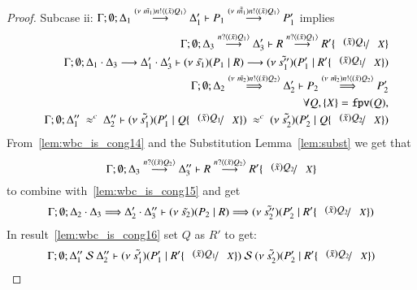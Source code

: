 \begin{proof}
	\noi Subcase ii: $\Gamma; \emptyset; \Delta_1 \stackrel{(\nu\ \tilde{m_1}) n ! \langle (\tilde{x})Q_1 \rangle}{\longrightarrow} \Delta_1' \vdash P_1 \stackrel{(\nu\ \tilde{\tilde{m_1}}) n ! \langle (\tilde{x})Q_1 \rangle}{\longrightarrow} P_1'$ implies
%
	\begin{eqnarray}
		& & \Gamma; \emptyset; \Delta_3 \by{\bactinp{n}{\abs{\tilde{x}} {Q_1}}} \Delta_3' \proves R \by{\bactinp{n}{\abs{\tilde{x}} {Q_1}}} R' \subst{\abs{\tilde{x}}{Q_1}}{X}
		\label{lem:wbc_is_cong14}\\
		& & \Gamma; \emptyset; \Delta_1 \cat \Delta_3 \by{} \Delta_1' \cat \Delta_3' \proves \newsp{\tilde{s_1}}{P_1 \Par R} \by{} \newsp{\tilde{s_1''}}{P_1' \Par R' \subst{\abs{\tilde{x}}{Q_1}}{X}} \nonumber \\
		& & \Gamma; \emptyset; \Delta_2\By{\news{\tilde{m_2}} \bactout{n}{\abs{\tilde{x}}{Q_2}}} \Delta_2' \proves P_2 \By{\news{\tilde{m_2}} \bactout{n}{\abs{\tilde{x}}{Q_2}}} P_2'
		\label{lem:wbc_is_cong15}\\
		& & \forall Q, \set{X} = \fpv{Q}, \nonumber \\
		& & \Gamma; \emptyset; \Delta_1''\ \wbc\ \Delta_2'' \proves \newsp{\tilde{s_1'}}{P_1' \Par Q \subst{(\tilde{x}) Q_1}{X}}\ \wbc\ \newsp{\tilde{s_2'}}{P_2' \Par Q \subst{(\tilde{x}) Q_2}{X}} \label{lem:wbc_is_cong16}
	\end{eqnarray}
%
	From~\ref{lem:wbc_is_cong14} and the Substitution Lemma~\ref{lem:subst} we get that
	\[
		\Gamma; \emptyset; \Delta_3 \by{\bactinp{n}{\abs{\tilde{x}} {Q_2}}} \Delta_3'' \proves R \by{\bactinp{n}{\abs{\tilde{x}} {Q_2}}} R' \subst{\abs{\tilde{x}}{Q_2}}{X}
	\]
	\noi to combine with~\ref{lem:wbc_is_cong15} and get
	\[
		\Gamma; \emptyset; \Delta_2 \cat \Delta_3 \By{} \Delta_2' \cat \Delta_3'' \proves \newsp{\tilde{s_2}}{P_2 \Par R} \By{} \newsp{\tilde{s_2''}}{P_2' \Par R' \subst{\abs{\tilde{x}}{Q_2}}{X}}
	\]
%
	\noi In result~\ref{lem:wbc_is_cong16} set $Q$ as $R'$ to get:
%
	\[
		\Gamma; \emptyset; \Delta_1''\ \mathcal{S}\ \Delta_2'' \proves \newsp{\tilde{s_1'}}{P_1' \Par R' \subst{\abs{\tilde{x}}{Q_1}}{X}}\ \mathcal{S}\ \newsp{\tilde{s_2'}}{P_2' \Par R' \subst{\abs{\tilde{x}}{Q_2}}{X}}
	\]


\end{proof}
